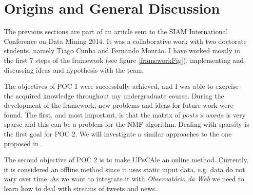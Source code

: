 \section{Origins and General Discussion}

The previous sections are part of an article sent to the SIAM International Conference on Data Mining 2014. It was a collaborative work with two doctorate students, namely Tiago Cunha and Fernando Mourão. I have worked mostly in the first 7 steps of the framework (see figure \ref{frameworkFig}), implementing and discussing ideas and hypothesis with the team.

The objectives of POC 1 were successfully achieved, and I was able to exercise the acquired knowledge throughout my undergraduate course.
During the development of the framework, new problems and ideas for future work were found. The first, and most important, is that the matrix of $posts \times words$ is very sparse and this can be a problem for the NMF algorithm. Dealing with sparsity is the first goal for POC 2. We will investigate a similar approaches to the one proposed in \cite{cheng:2013}.

The second objective of POC 2 is to make UPsCAle an online method. Currently, it is considered an offline method since it uses static input data, e.g. data do not vary over time. As we want to integrate it with \textit{Observatório da Web} we need to learn how to deal with streams of tweets and news. 



